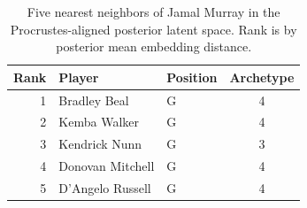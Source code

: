 \begin{table}[htbp]
  \centering\small
  \begin{tabular}{rllc}
    \toprule
    Rank & Player & Position & Archetype \\
    \midrule
    1 & Bradley Beal & G & 4 \\
    2 & Kemba Walker & G & 4 \\
    3 & Kendrick Nunn & G & 3 \\
    4 & Donovan Mitchell & G & 4 \\
    5 & D'Angelo Russell & G & 4 \\
    \bottomrule
  \end{tabular}
  \caption{Five nearest neighbors of Jamal Murray in the Procrustes-aligned posterior latent space. Rank is by posterior mean embedding distance.}
  \label{tab:Jamal_Murray_neighbors}
\end{table}

